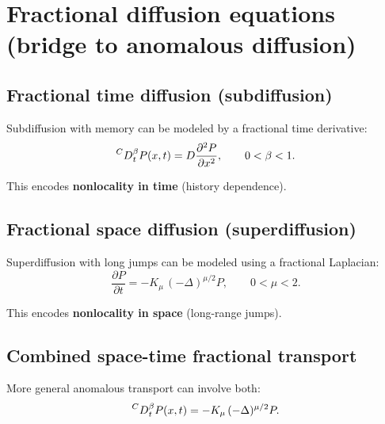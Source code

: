 \section{Fractional diffusion equations (bridge to anomalous diffusion)}

\subsection{Fractional time diffusion (subdiffusion)}
Subdiffusion with memory can be modeled by a fractional time derivative:
\begin{equation}
\prescript{C}{}D_t^\beta P(x,t)
=
D\frac{\partial^2 P}{\partial x^2},
\qquad 0<\beta<1.
\end{equation}

This encodes \textbf{nonlocality in time} (history dependence).

\subsection{Fractional space diffusion (superdiffusion)}
Superdiffusion with long jumps can be modeled using a fractional Laplacian:
\begin{equation}
\frac{\partial P}{\partial t}
=
- K_\mu\,(-\Delta)^{\mu/2}P,
\qquad 0<\mu<2.
\end{equation}

This encodes \textbf{nonlocality in space} (long-range jumps).

\subsection{Combined space-time fractional transport}
More general anomalous transport can involve both:
\begin{equation}
\prescript{C}{}D_t^\beta P(x,t)
=
- K_\mu\,(-\Delta)^{\mu/2}P.
\end{equation}


